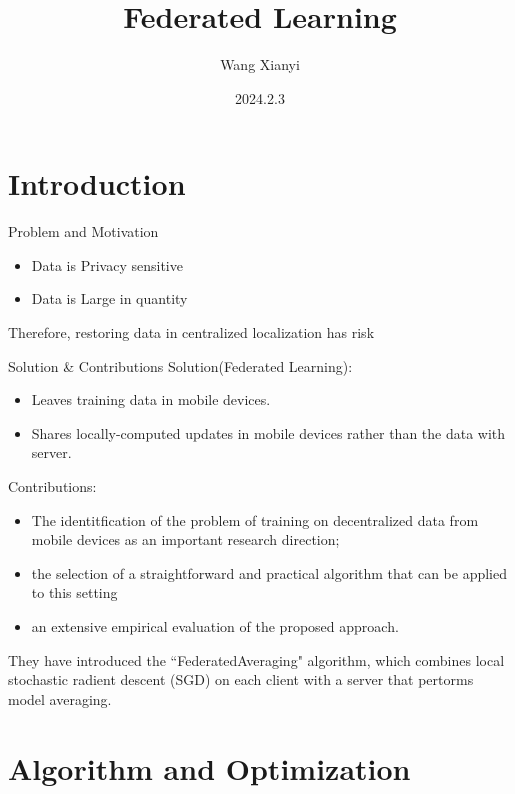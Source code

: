 \documentclass{beamer}
\author{Wang Xianyi}
\title{Federated Learning}
\institute{LZU}
\date{2024.2.3}
\begin{document}
\kaishu
\begin{frame}
	\titlepage
\end{frame}

\begin{frame}
	\tableofcontents[sectionstyle=show,subsectionstyle=show/shaded/hide,subsubsectionstyle=show/shaded/hide]
\end{frame}


\section{Introduction}

\begin{frame}{Problem and Motivation}
	\begin{itemize}
		\item Data is Privacy sensitive
		\item Data is Large in quantity
	\end{itemize}
	Therefore, restoring data in centralized localization has risk

\end{frame}

\begin{frame}{Solution \& Contributions}
	Solution(Federated Learning):
	\begin{itemize}
		\item Leaves training data in mobile devices.
		\item Shares locally-computed updates in mobile devices rather than the data with server.
	\end{itemize}
	Contributions:
	\begin{itemize}
		\item The identitfication of the problem of training on decentralized data from mobile devices as an important research direction;
		\item the selection of a straightforward and practical algorithm that can be applied to this setting
		\item an extensive empirical evaluation of the proposed approach.
	\end{itemize}
	They have introduced the “FederatedAveraging\cite{mcmahan2017communication}" algorithm, which combines local stochastic radient descent (SGD) on each client with a server that pertorms model averaging.
\end{frame}

\section{Algorithm and Optimization}
\end{document}
